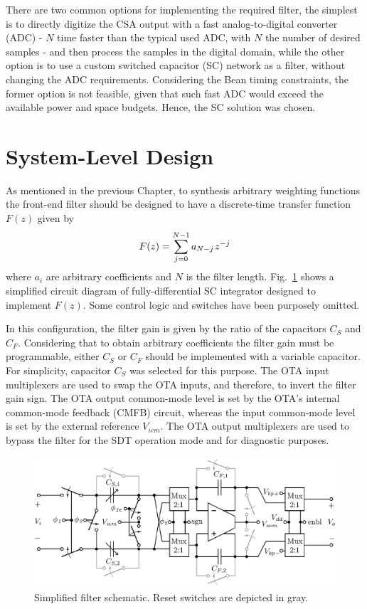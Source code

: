 There are two common options for implementing the required filter, the simplest is to directly digitize the CSA output with a fast analog-to-digital converter (ADC)  - $N$ time faster than the typical used ADC, with $N$ the number of desired samples - and then process the samples in the digital domain, while the other option is to use a custom switched capacitor (SC) network as a filter, without changing the ADC requirements. Considering the Bean timing constraints, the former option is not feasible, given that such fast ADC would exceed the available power and space budgets. Hence, the SC solution was chosen.


\section{System-Level Design}

As mentioned in the previous Chapter, to synthesis arbitrary weighting functions the front-end filter should be designed to have a  discrete-time transfer function $F(z)$ given by
\begin{equation}
F(z) = \sum_{j=0}^{N-1}a_{N-j} \hspace{0.1em}z^{-j} \label{eq:filter_tf}
\end{equation}
where $a_i$ are arbitrary coefficients and $N$ is the filter length. Fig.~\ref{fig:filter_post} shows a simplified circuit diagram of fully-differential SC integrator designed to implement $F(z)$. Some control logic and switches have been purposely omitted.

In this configuration, the filter gain is given by the ratio of the capacitors $C_S$ and $C_F$.  Considering that to obtain arbitrary coefficients the filter gain must be programmable, either $C_S$ or $C_F$ should be implemented with a variable capacitor. For simplicity, capacitor $C_S$ was selected for this purpose. The OTA input multiplexers are used to swap the OTA inputs, and therefore, to invert the filter gain sign. The OTA output common-mode level is set by the OTA's internal common-mode feedback (CMFB) circuit, whereas the input common-mode level is set by the external reference $V_\textit{icm}$. The OTA output multiplexers are used to bypass the filter for the SDT operation mode and for diagnostic purposes.


\begin{figure}[!t]
	\centering
	\includegraphics[width=6in]{./Figures/Filter/filter_post.eps}
	\caption{Simplified filter schematic. Reset switches are depicted in gray.}\label{fig:filter_post}
\end{figure}

